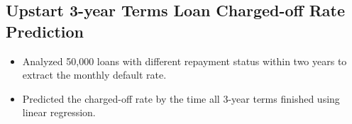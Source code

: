 \documentclass[11pt, letterpaper]{yt_resume}   	%
\begin{document}
\subsection{Upstart 3-year Terms Loan Charged-off Rate Prediction}{}{}{}{}
\begin{itemize}
\item Analyzed 50,000 loans with different repayment status within two years to extract the monthly default rate.
\item Predicted the charged-off rate by the time all 3-year terms finished using linear regression.
\end{itemize}

\end{document}
